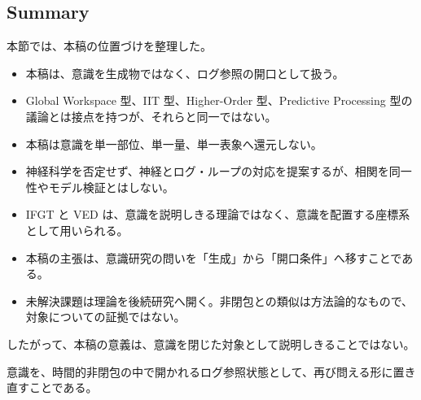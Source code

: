 \subsection{Summary}

本節では、本稿の位置づけを整理した。

\begin{itemize}
\item 本稿は、意識を生成物ではなく、ログ参照の開口として扱う。
\item Global Workspace 型、IIT 型、Higher-Order 型、Predictive Processing 型の議論とは接点を持つが、それらと同一ではない。
\item 本稿は意識を単一部位、単一量、単一表象へ還元しない。
\item 神経科学を否定せず、神経とログ・ループの対応を提案するが、相関を同一性やモデル検証とはしない。
\item IFGT と VED は、意識を説明しきる理論ではなく、意識を配置する座標系として用いられる。
\item 本稿の主張は、意識研究の問いを「生成」から「開口条件」へ移すことである。
\item 未解決課題は理論を後続研究へ開く。非閉包との類似は方法論的なもので、対象についての証拠ではない。
\end{itemize}

したがって、本稿の意義は、意識を閉じた対象として説明しきることではない。

意識を、時間的非閉包の中で開かれるログ参照状態として、再び問える形に置き直すことである。
